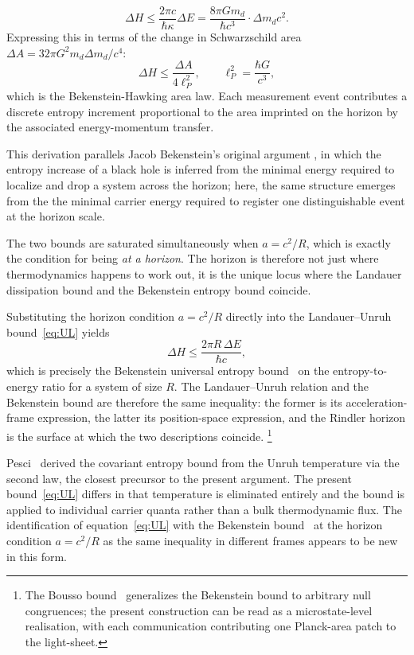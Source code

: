 \documentclass[12pt,a4paper]{article}
\begin{document}
\begin{equation}
\Delta H \leq \frac{2\pi c}{\hbar \kappa} \Delta E = \frac{8\pi G m_d}{\hbar c^3} \cdot \Delta m_d c^2.
\end{equation}
Expressing this in terms of the change in Schwarzschild area $\Delta A = 32\pi G^2 m_d \Delta m_d / c^4$:
\begin{equation}
\Delta H \le \frac{\Delta A}{4 \ell_P^2}, \qquad \ell_P^2 = \frac{\hbar G}{c^3},
\end{equation}
which is the Bekenstein-Hawking area law. Each measurement event contributes a discrete entropy increment proportional to the area imprinted on the horizon by the associated energy-momentum transfer.

This derivation parallels Jacob Bekenstein’s original argument \cite{bekenstein}, in which the entropy increase of a black hole is inferred from the minimal energy required to localize and drop a system across the horizon; here, the same structure emerges from the
the minimal carrier energy required to register one 
distinguishable event at the horizon scale.

The two bounds are saturated simultaneously when $a = c^2/R$,  which is exactly the condition for being {\it at a horizon}. The horizon is therefore not just where thermodynamics happens to work out, it is
the unique locus where the Landauer dissipation bound and 
the Bekenstein entropy bound coincide.

Substituting the horizon condition $a = c^2/R$ directly 
into the Landauer--Unruh bound~\eqref{eq:UL} yields
\begin{equation}
    \Delta H \leq \frac{2\pi R\,\Delta E}{\hbar c},
\end{equation}
which is precisely the Bekenstein universal entropy 
bound~\cite{bekenstein1981universal} on the 
entropy-to-energy ratio for a system of size $R$. 
The Landauer--Unruh relation and the Bekenstein bound 
are therefore the same inequality: the former is its 
acceleration-frame expression, the latter its 
position-space expression, and the Rindler horizon is 
the surface at which the two descriptions coincide.
\footnote{The Bousso bound~\cite{bousso1999covariant} generalizes 
the Bekenstein bound to arbitrary null congruences; the present 
construction can be read as a microstate-level realisation, 
with each communication contributing one Planck-area patch 
to the light-sheet.}

Pesci~\cite{pesci2007unruh} derived the covariant entropy bound from the 
Unruh temperature via the second law, the closest precursor to the present 
argument. The present bound~\eqref{eq:UL} differs in that temperature is 
eliminated entirely and the bound is applied to individual carrier quanta 
rather than a bulk thermodynamic flux. The identification of 
equation~\eqref{eq:UL} with the Bekenstein 
bound~\cite{bekenstein1981universal} at the horizon condition $a = c^2/R$ 
as the same inequality in different frames appears to be new in this form.





\end{document}
